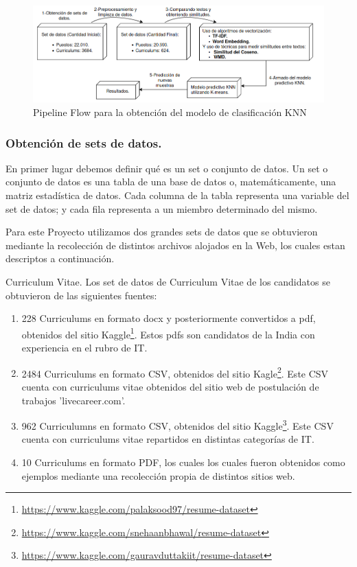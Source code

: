 \documentclass[12pt,a4paper]{article}
\makeatletter
\renewcommand\paragraph{\@startsection{paragraph}{4}{\z@}
            {-2.5ex\@plus -1ex \@minus -.25ex}
            {1.25ex \@plus .25ex}
            {\normalfont\normalsize\bfseries}}
\makeatother
\begin{document}
\begin{sloppypar}
\begin{figure}[H]    %
  \centering
  \includegraphics[width=1\textwidth]{images/flow-core.png} 	%
  \caption{Pipeline Flow para la obtención del modelo de clasificación KNN}  
  \label{fig:FlowCoreSystem}
\end{figure}

\cleardoublepage

\subsubsection{Obtención de sets de datos.}\label{obtencion_set_datos}
En primer lugar debemos definir qué es un set o conjunto de datos.
Un set o conjunto de datos es una tabla de una base de datos o, matemáticamente, una matriz estadística de datos. Cada columna de la tabla representa una variable del set de datos; y cada fila representa a un miembro determinado del mismo.

Para este Proyecto utilizamos dos grandes sets de datos que se obtuvieron mediante la recolección de distintos archivos alojados en la Web, los cuales estan descriptos a continuación.

\paragraph{Curriculum Vitae.}
Los set de datos de Curriculum Vitae de los candidatos se obtuvieron de las siguientes fuentes:

\begin{enumerate}
\item 228 Curriculums en formato docx y posteriormente convertidos a pdf, obtenidos del sitio Kaggle\footnote{\url{https://www.kaggle.com/palaksood97/resume-dataset}}. Estos pdfs son candidatos de la India con experiencia en el rubro de IT.
\item 2484 Curriculums en formato CSV, obtenidos del sitio Kagle\footnote{\url{https://www.kaggle.com/snehaanbhawal/resume-dataset}}. Este CSV cuenta con curriculums vitae obtenidos del sitio web de postulación de trabajos 'livecareer.com'.
\item 962 Curriculumns en formato CSV, obtenidos del sitio Kaggle\footnote{\url{https://www.kaggle.com/gauravduttakiit/resume-dataset}}. Este CSV cuenta con curriculums vitae repartidos en distintas categorías de IT.
\item 10 Curriculums en formato PDF, los cuales los cuales fueron obtenidos como ejemplos mediante una recolección propia de distintos sitios web. 
\end{enumerate}


\end{sloppypar}
\end{document}
